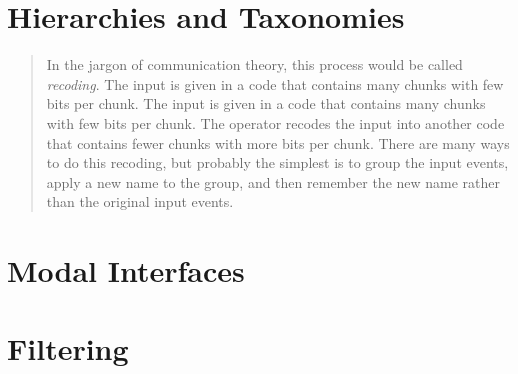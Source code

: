 \section{Hierarchies and Taxonomies}

\begin{comment}
Magic number seven, George Miller
recoding pg. 93
increasing bits per chunk
The Structure of the Information Visualization Design Space, Section 2
enclosure
\end{comment}

\begin{quote}
In the jargon of communication theory, this process would be called \emph{recoding}. The input is given in a code that contains many chunks with few bits per chunk. The input is given in a code that contains many chunks with few bits per chunk. The operator recodes the input into another code that contains fewer chunks with more bits per chunk. There are many ways to do this recoding, but probably the simplest is to group the input events, apply a new name to the group, and then remember the new name rather than the original input events. \cite{seven1956}
\end{quote}

\section{Modal Interfaces}

\section{Filtering}

\begin{comment}
The Structure of the Information Visualization Design Space, Section 5
dynamic queries technique 

Visual Information Seeking: Tight Coupling of Dynamic Query Filters with Starfield Displays
\end{comment}
